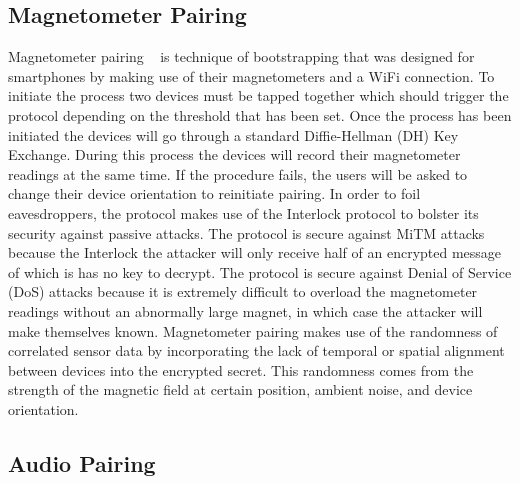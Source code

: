 \subsection{Magnetometer Pairing}
Magnetometer pairing ~\cite{jin2014magpairing} is technique of bootstrapping that was designed for smartphones by making use of their magnetometers and a WiFi connection. To initiate the process two devices must be tapped together which should trigger the protocol depending on the threshold that has been set. Once the process has been initiated the devices will go through a standard Diffie-Hellman (DH) Key Exchange. During this process the devices will record their magnetometer readings at the same time. If the procedure fails, the users will be asked to change their device orientation to reinitiate pairing.  In order to foil eavesdroppers, the protocol makes use of the Interlock protocol to bolster its security against passive attacks. The protocol is secure against MiTM attacks because the Interlock the attacker will only receive half of an encrypted message of which is has no key to decrypt. The protocol is secure against Denial of Service (DoS) attacks because it is extremely difficult to overload the magnetometer readings without an abnormally large magnet, in which case the attacker will make themselves known. Magnetometer pairing makes use of the randomness of correlated sensor data by incorporating the lack of temporal or spatial alignment between devices into the encrypted secret. This randomness comes from the strength of the magnetic field at certain position, ambient noise, and device orientation.

\subsection{Audio Pairing}
